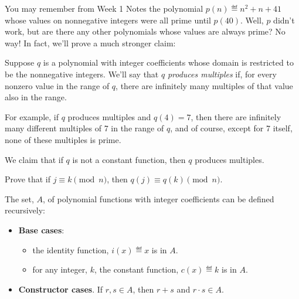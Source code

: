 \documentclass[handout]{mcs}
\begin{document}
\begin{problem}
  You may remember from Week 1 Notes the polynomial $p(n) \eqdef n^2 + n +
  41$ whose values on nonnegative integers were all prime until $p(40)$.
  Well, $p$ didn't work, but are there any other polynomials whose values
  are always prime?  No way!  In fact, we'll prove a much stronger claim:

  Suppose $q$ is a polynomial with integer coefficients whose domain is
  restricted to be the nonnegative integers.  We'll say that $q$
  \emph{produces multiples} if, for every nonzero value in the range of $q$,
  there are infinitely many multiples of that value also in the range.

  For example, if $q$ produces multiples and $q(4) = 7$, then there are
  infinitely many different multiples of 7 in the range of $q$, and of
  course, except for 7 itself, none of these multiples is prime.

  We claim that if $q$ is not a constant function, then $q$ produces
  multiples.

  \bparts

  \ppart\label{jk} Prove that if $j \equiv k \pmod n$, then $q(j) \equiv
  q(k) \pmod n$.

  \hint The set, $A$, of polynomial functions with integer coefficients can be
  defined recursively:
\begin{itemize}
\item \textbf{Base cases}:
  \begin{itemize}

   \item the identity function, $i(x) \eqdef x$ is in $A$.

   \item for any integer, $k$, the constant function, $c(x) \eqdef k$ is in $A$.
  \end{itemize}

\item \textbf{Constructor cases}.  If $r,s \in A$, then $r+s$ and $r \cdot
  s \in A$.
\end{itemize}

\end{problem}
\end{document}
